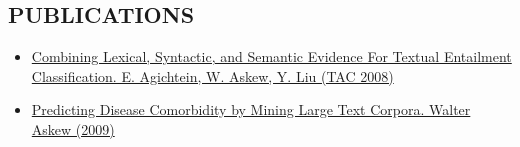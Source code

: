 \documentclass[line,margin]{res}
\begin{document}
\begin{resume}
\section{PUBLICATIONS}
\begin{itemize}
  \item \href{http://www.nist.gov/tac/publications/2008/participant.papers/Emory.proceedings.pdf}{Combining Lexical, Syntactic, and Semantic Evidence For
      Textual Entailment Classification.  E. Agichtein, W. Askew, Y. Liu
      (TAC 2008)}
  \item \href{https://etd.library.emory.edu/view/record/pid/emory:1b6tn}
    {Predicting Disease Comorbidity by Mining Large Text
      Corpora. Walter Askew (2009)}
\end{itemize}

\end{resume}
\end{document}
